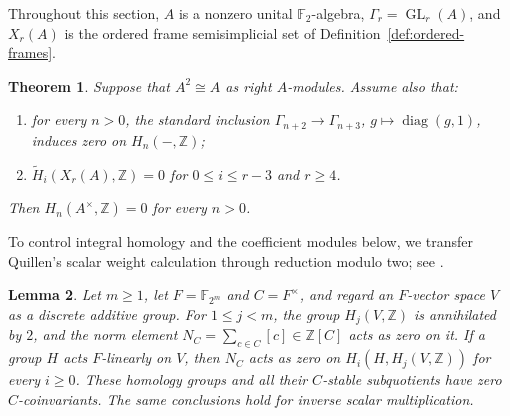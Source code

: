 \documentclass[10pt,a4paper]{amsart}
\newcommand{\Z}{\mathbb Z}
\newcommand{\F}{\mathbb F}
\DeclareMathOperator{\GL}{GL}
\newtheorem{theorem}{Theorem}[section]
\newtheorem{lemma}[theorem]{Lemma}
\numberwithin{equation}{section}
\begin{document}
Throughout this section, $A$ is a nonzero unital $\F_2$-algebra, $\Gamma_r=\GL_r(A)$, and $X_r(A)$ is the ordered frame semisimplicial set of Definition~\ref{def:ordered-frames}.

\begin{theorem}\label{thm:acyclicity-criterion}
Suppose that $A^2\cong A$ as right $A$-modules. Assume also that:
\begin{enumerate}
\item for every $n>0$, the standard inclusion $\Gamma_{n+2}\to\Gamma_{n+3}$, $g\mapsto\operatorname{diag}(g,1)$, induces zero on $H_n(-,\Z)$;
\item $\widetilde H_i(X_r(A),\Z)=0$ for $0\leq i\leq r-3$ and $r\geq4$.
\end{enumerate}
Then $H_n(A^\times,\Z)=0$ for every $n>0$.
\end{theorem}

To control integral homology and the coefficient modules below, we transfer Quillen's scalar weight calculation through reduction modulo two; see \cite[\S11, Lemmas~15--16]{Quillen72}.

\begin{lemma}\label{lem:scalar-homology}
Let $m\geq1$, let $F=\F_{2^m}$ and $C=F^\times$, and regard an $F$-vector space $V$ as a discrete additive group. For $1\leq j<m$, the group $H_j(V,\Z)$ is annihilated by $2$, and the norm element $N_C=\sum_{c\in C}[c]\in\Z[C]$ acts as zero on it. If a group $H$ acts $F$-linearly on $V$, then $N_C$ acts as zero on $H_i(H,H_j(V,\Z))$ for every $i\geq0$. These homology groups and all their $C$-stable subquotients have zero $C$-coinvariants. The same conclusions hold for inverse scalar multiplication.
\end{lemma}
\end{document}
